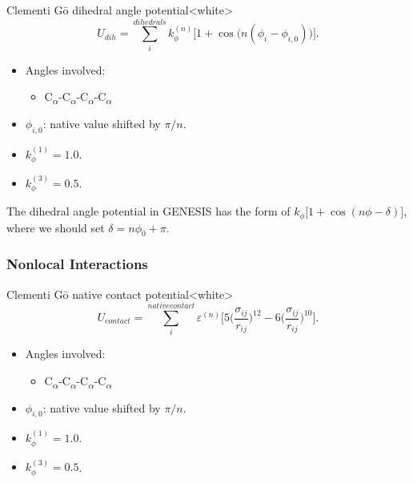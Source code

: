 \begin{smallpage}{Clementi G\={o} dihedral angle potential}<white>
  \begin{equation}
    \label{eq:protein_cc_go_local_dihedral_angle}
    U_{dih} = \sum_{i}^{dihedrals} k_{\phi}^{(n)} \big[ 1+\cos\big(n( \phi_i - \phi_{ i,0 } )\big) \big].
  \end{equation}
  \tcblower
  \begin{itemize}
  \item Angles involved:
    \begin{itemize}
    \item C\textsubscript{$\alpha$}-C\textsubscript{$\alpha$}-C\textsubscript{$\alpha$}-C\textsubscript{$\alpha$}
    \end{itemize}
  \item $\phi_{i, 0}$: native value shifted by $\pi/n$.
  \item $k_\phi^{(1)} = 1.0$.
  \item $k_\phi^{(3)} = 0.5$.
  \end{itemize}
\end{smallpage}

\note{} The dihedral angle potential in GENESIS has the form of $k_{\phi} \big[
1+\cos(n\phi - \delta)\big]$, where we should set $\delta = n\phi_0 + \pi$.


\subsubsection{Nonlocal Interactions}
\label{sec:protein_cc_go_potential_nonlocal}

\begin{smallpage}{Clementi G\={o} native contact potential}<white>
  \begin{equation}
    \label{eq:protein_cc_go_native_contact}
    U_{contact} = \sum_{i}^{native contact} \varepsilon^{(n)} \big[ 5 \big( \frac{\sigma_{ij}}{r_{ij}} \big)^{12} - 6 \big( \frac{\sigma_{ij}}{r_{ij}} \big)^{10}\big].
  \end{equation}
  \tcblower
  \begin{itemize}
  \item Angles involved:
    \begin{itemize}
    \item C\textsubscript{$\alpha$}-C\textsubscript{$\alpha$}-C\textsubscript{$\alpha$}-C\textsubscript{$\alpha$}
    \end{itemize}
  \item $\phi_{i, 0}$: native value shifted by $\pi/n$.
  \item $k_\phi^{(1)} = 1.0$.
  \item $k_\phi^{(3)} = 0.5$.
  \end{itemize}
\end{smallpage}

